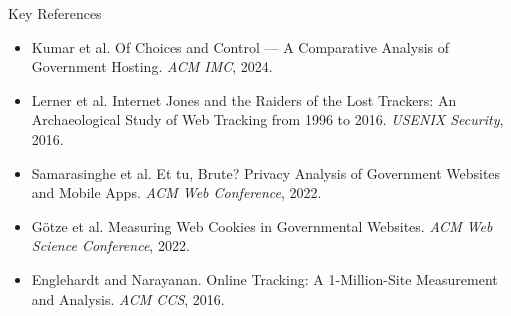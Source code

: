   \begin{block}{Key References}

    \footnotesize{
    \begin{itemize}
      \item Kumar et al. Of Choices and Control --- A Comparative Analysis of Government Hosting. \emph{ACM IMC}, 2024.
      \item Lerner et al. Internet Jones and the Raiders of the Lost Trackers: An Archaeological Study of Web Tracking from 1996 to 2016. \emph{USENIX Security}, 2016.
      \item Samarasinghe et al. Et tu, Brute? Privacy Analysis of Government Websites and Mobile Apps. \emph{ACM Web Conference}, 2022.
      \item G\"otze et al. Measuring Web Cookies in Governmental Websites. \emph{ACM Web Science Conference}, 2022.
      \item Englehardt and Narayanan. Online Tracking: A 1-Million-Site Measurement and Analysis. \emph{ACM CCS}, 2016.
    \end{itemize}
    }

  \end{block}
